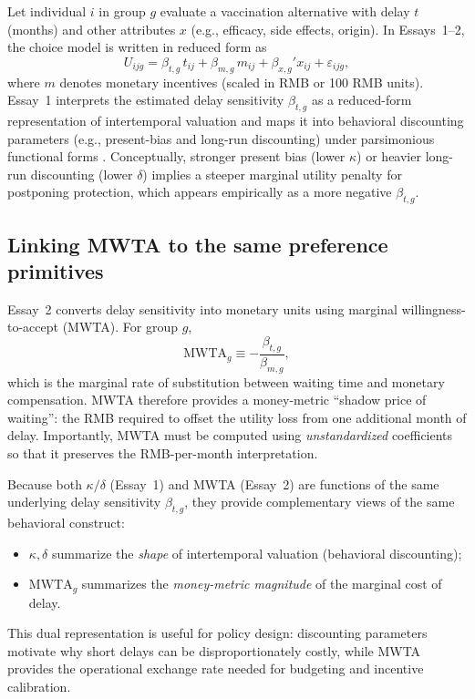 \documentclass[doublespacing]{utdthesis}
\let\cite=\citep
\begin{document}
Let individual $i$ in group $g$ evaluate a vaccination alternative with delay $t$ (months) and other attributes $x$ (e.g., efficacy, side effects, origin). In Essays~1--2, the choice model is written in reduced form as
\begin{equation}
U_{ijg} = \beta_{t,g}\, t_{ij} + \beta_{m,g}\, m_{ij} + \beta_{x,g}'x_{ij} + \varepsilon_{ijg},
\end{equation}
where $m$ denotes monetary incentives (scaled in RMB or 100 RMB units). Essay~1 interprets the estimated delay sensitivity $\beta_{t,g}$ as a reduced-form representation of intertemporal valuation and maps it into behavioral discounting parameters (e.g., present-bias and long-run discounting) under parsimonious functional forms \cite{Laibson1997,ODonoghueRabin2001,Frederick2002}. Conceptually, stronger present bias (lower $\kappa$) or heavier long-run discounting (lower $\delta$) implies a steeper marginal utility penalty for postponing protection, which appears empirically as a more negative $\beta_{t,g}$.

\subsection{Linking MWTA to the same preference primitives}
\label{subsec:essay3_link_mwta}

Essay~2 converts delay sensitivity into monetary units using marginal willingness-to-accept (MWTA). For group $g$,
\begin{equation}
\text{MWTA}_g \equiv -\frac{\beta_{t,g}}{\beta_{m,g}},
\end{equation}
which is the marginal rate of substitution between waiting time and monetary compensation. MWTA therefore provides a money-metric ``shadow price of waiting'': the RMB required to offset the utility loss from one additional month of delay. Importantly, MWTA must be computed using \emph{unstandardized} coefficients so that it preserves the RMB-per-month interpretation.

Because both $\kappa/\delta$ (Essay~1) and MWTA (Essay~2) are functions of the same underlying delay sensitivity $\beta_{t,g}$, they provide complementary views of the same behavioral construct:
\begin{itemize}[leftmargin=*]
\item $\kappa,\delta$ summarize the \emph{shape} of intertemporal valuation (behavioral discounting);
\item $\text{MWTA}_g$ summarizes the \emph{money-metric magnitude} of the marginal cost of delay.
\end{itemize}
This dual representation is useful for policy design: discounting parameters motivate why short delays can be disproportionately costly, while MWTA provides the operational exchange rate needed for budgeting and incentive calibration.
\end{document}
